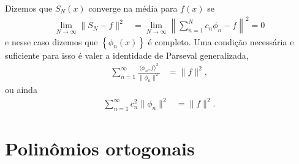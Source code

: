 Dizemos que $S_N(x)$ converge na média para $f(x)$ se
\begin{align*}
    \lim_{N \to \infty} \| S_N - f \|^2 &= \lim_{N \to \infty} \left\| \sum_{n = 1}^N c_n \phi_n - f \right\|^2 = 0
\end{align*}
e nesse caso dizemos que $\left\{ \phi_n(x) \right\}$ é completo. Uma condição necessária e suficiente para isso é valer a identidade de Parseval generalizada,
\begin{align*}
    \sum_{n = 1}^\infty \frac{\langle \phi_n, f \rangle^2}{\| \phi_n \|^2} &= \| f \|^2,
\end{align*}
ou ainda
\begin{align*}
    \sum_{n = 1}^\infty c_n^2 \| \phi_n \|^2 &= \| f \|^2.
\end{align*}

\section{Polinômios ortogonais}
